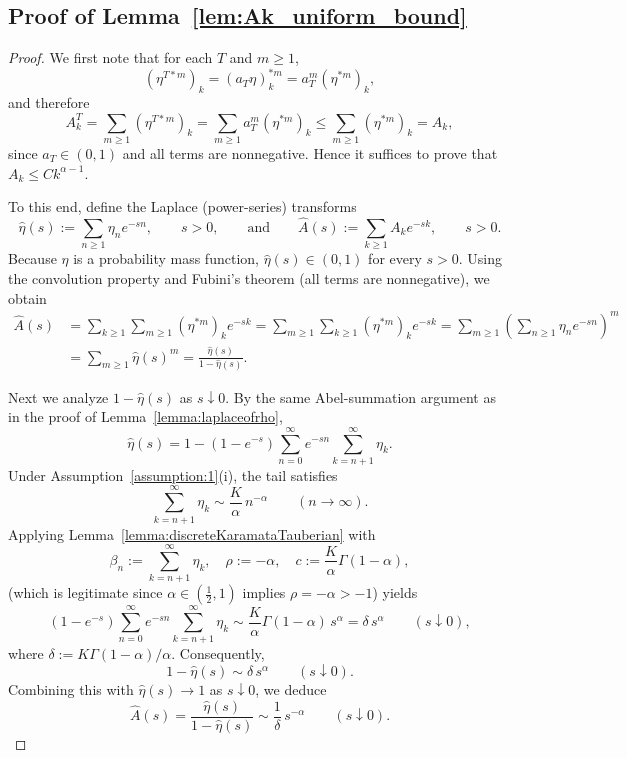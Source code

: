 \documentclass[letterpaper]{article}
\numberwithin{equation}{section}
\theoremstyle{definition}
\theoremstyle{remark}
\begin{document}

\subsection{Proof of Lemma~\ref{lem:Ak_uniform_bound}}\label{pf:Ak_uniform_bound}
\begin{proof}
We first note that for each $T$ and $m\ge1$,
\[
(\eta^{T*m})_k=(a_T\eta)^{*m}_k=a_T^m(\eta^{*m})_k,
\]
and therefore
\[
A_k^T=\sum_{m\ge1}(\eta^{T*m})_k=\sum_{m\ge1}a_T^m(\eta^{*m})_k
\le \sum_{m\ge1}(\eta^{*m})_k = A_k,
\]
since $a_T\in(0,1)$ and all terms are nonnegative. Hence it suffices to prove that
$A_k\le C k^{\alpha-1}$.

To this end, define the Laplace (power-series) transforms
\[
\hat\eta(s):=\sum_{n\ge1}\eta_n e^{-sn},\qquad s>0,
\qquad\text{and}\qquad
\hat A(s):=\sum_{k\ge1}A_k e^{-sk},\qquad s>0.
\]
Because $\eta$ is a probability mass function, $\hat\eta(s)\in(0,1)$ for every $s>0$.
Using the convolution property and Fubini's theorem (all terms are nonnegative), we obtain
\begin{align*}
\hat A(s)
&=\sum_{k\ge1}\sum_{m\ge1}(\eta^{*m})_k e^{-sk}
=\sum_{m\ge1}\sum_{k\ge1}(\eta^{*m})_k e^{-sk}
=\sum_{m\ge1}\left(\sum_{n\ge1}\eta_n e^{-sn}\right)^m \\
&=\sum_{m\ge1}\hat\eta(s)^m
=\frac{\hat\eta(s)}{1-\hat\eta(s)}.
\end{align*}

Next we analyze $1-\hat\eta(s)$ as $s\downarrow0$. By the same Abel-summation argument as in
the proof of Lemma~\ref{lemma:laplaceofrho},
\[
\hat\eta(s)
=1-(1-e^{-s})\sum_{n=0}^\infty e^{-sn}\sum_{k=n+1}^\infty\eta_k.
\]
Under Assumption~\ref{assumption:1}(i), the tail satisfies
\[
\sum_{k=n+1}^\infty\eta_k \sim \frac{K}{\alpha}\,n^{-\alpha}\qquad(n\to\infty).
\]
Applying Lemma~\ref{lemma:discreteKaramataTauberian} with
\[
\beta_n:=\sum_{k=n+1}^\infty\eta_k,\quad
\rho:=-\alpha,\quad
c:=\frac{K}{\alpha}\Gamma(1-\alpha),
\]
(which is legitimate since $\alpha\in(\frac12,1)$ implies $\rho=-\alpha>-1$) yields
\[
(1-e^{-s})\sum_{n=0}^\infty e^{-sn}\sum_{k=n+1}^\infty\eta_k
\sim \frac{K}{\alpha}\Gamma(1-\alpha)\,s^\alpha
=\delta\,s^\alpha
\qquad(s\downarrow0),
\]
where $\delta:=K\Gamma(1-\alpha)/\alpha$. Consequently,
\[
1-\hat\eta(s)\sim \delta\,s^\alpha\qquad(s\downarrow0).
\]
Combining this with $\hat\eta(s)\to1$ as $s\downarrow0$, we deduce
\[
\hat A(s)=\frac{\hat\eta(s)}{1-\hat\eta(s)}
\sim \frac{1}{\delta}\,s^{-\alpha}\qquad(s\downarrow0).
\]


\end{proof}
\end{document}
